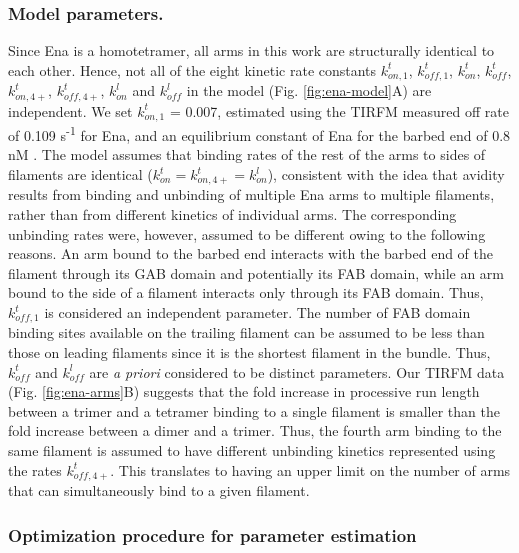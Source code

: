 \subsubsection{Model parameters.}\label{ena-si-parameters}
Since Ena is a homotetramer, all arms in this work are structurally identical to each other. Hence, not all of the eight kinetic rate constants $k_{on,1}^{t}$, $k_{off,1}^{t}$, $k_{on}^{t}$, $k_{off}^{t}$, $k_{on,4+}^{t}$, $k_{off,4+}^{t}$,  $k_{on}^{l}$ and $k_{off}^{l}$ in the model (Fig. \ref{fig:ena-model}A) are independent. We set $k_{on,1}^{t}$ = 0.007, estimated using the TIRFM measured off rate of 0.109 s\textsuperscript{-1} for Ena, and an equilibrium constant of Ena for the barbed end of 0.8 nM \citep{winkelman_ena/vasp_2014}. The model assumes that binding rates of the rest of the arms to sides of filaments are identical ($k_{on}^{t} = k_{on,4+}^{t} = k_{on}^{l}$), consistent with the idea that avidity results from binding and unbinding of multiple Ena arms to multiple filaments, rather than from different kinetics of individual arms.  The corresponding unbinding rates were, however, assumed to be different owing to the following reasons. An arm bound to the barbed end interacts with the barbed end of the filament through its GAB domain and potentially its FAB domain, while an arm bound to the side of a filament interacts only through its FAB domain. Thus, $k_{off,1}^{t}$ is considered an independent parameter.  The number of FAB domain binding sites available on the trailing filament can be assumed to be less than those on leading filaments since it is the shortest filament in the bundle. Thus, $k_{off}^{t}$ and $k_{off}^{l}$ are \textit{a priori} considered to be distinct parameters. Our TIRFM data (Fig. \ref{fig:ena-arms}B) suggests that the fold increase in processive run length between a trimer and a tetramer binding to a single filament is smaller than the fold increase between a dimer and a trimer. Thus, the fourth arm binding to the same filament is assumed to have different unbinding kinetics represented using the rates $k_{off,4+}^{t}$. This translates to having an upper limit on the number of arms that can simultaneously bind to a given filament.

\subsubsection{Optimization procedure for parameter estimation}\label{ena-si-optimization}


